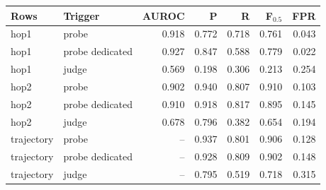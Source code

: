 \begin{tabular}{llrrrrr}
\toprule
Rows & Trigger & AUROC & P & R & F$_{0.5}$ & FPR \\
\midrule
hop1 & probe & 0.918 & 0.772 & 0.718 & 0.761 & 0.043 \\
hop1 & probe dedicated & 0.927 & 0.847 & 0.588 & 0.779 & 0.022 \\
hop1 & judge & 0.569 & 0.198 & 0.306 & 0.213 & 0.254 \\
hop2 & probe & 0.902 & 0.940 & 0.807 & 0.910 & 0.103 \\
hop2 & probe dedicated & 0.910 & 0.918 & 0.817 & 0.895 & 0.145 \\
hop2 & judge & 0.678 & 0.796 & 0.382 & 0.654 & 0.194 \\
trajectory & probe & – & 0.937 & 0.801 & 0.906 & 0.128 \\
trajectory & probe dedicated & – & 0.928 & 0.809 & 0.902 & 0.148 \\
trajectory & judge & – & 0.795 & 0.519 & 0.718 & 0.315 \\
\bottomrule
\end{tabular}
